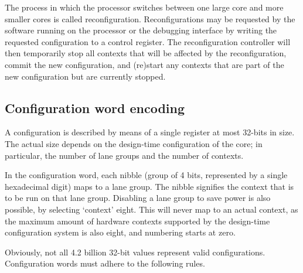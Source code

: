 
\label{sec:core-ug-reconf}

The process in which the \rvex{} processor switches between one large core and
more smaller cores is called reconfiguration. Reconfigurations may be requested
by the software running on the processor or the debugging interface by writing
the requested configuration to a control register. The reconfiguration
controller will then temporarily stop all contexts that will be affected by the
reconfiguration, commit the new configuration, and (re)start any contexts that
are part of the new configuration but are currently stopped.

\subsection{Configuration word encoding}
\label{sec:core-ug-reconf-word}

A configuration is described by means of a single register at most 32-bits in
size. The actual size depends on the design-time configuration of the core; in
particular, the number of lane groups and the number of contexts.

In the configuration word, each nibble (group of 4 bits, represented by a single
hexadecimal digit) maps to a lane group. The nibble signifies the context that
is to be run on that lane group. Disabling a lane group to save power is also
possible, by selecting `context' eight. This will never map to an actual
context, as the maximum amount of hardware contexts supported by the design-time
configuration system is also eight, and numbering starts at zero.

Obviously, not all 4.2 billion 32-bit values represent valid configurations.
Configuration words must adhere to the following rules.

